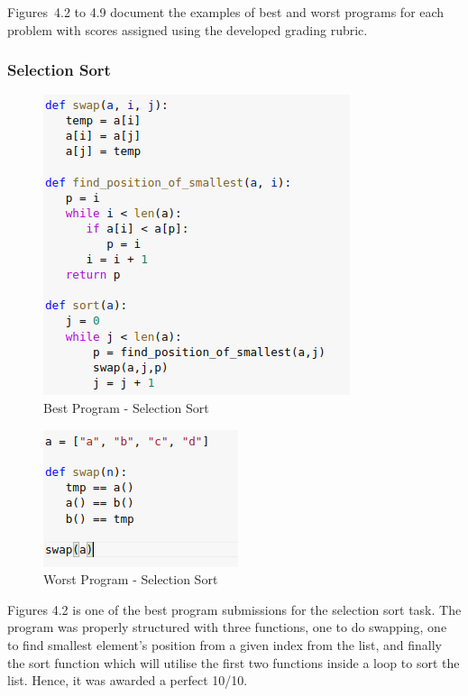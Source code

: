 Figures~4.2 to 4.9 document the examples of best and worst
programs for each problem with scores assigned using the
developed grading rubric.

\subsubsection{Selection Sort}

\begin{figure}[h]
\centering
\includegraphics[]{./figures/best_ss.png}
\caption{Best Program - Selection Sort}
\label{fig1}
\end{figure}

\begin{figure}[H]
\centering
\includegraphics[scale=1.2]{./figures/ss_worst.png}
\caption{Worst Program - Selection Sort}
\label{fig1}
\end{figure}


Figures 4.2 is one of the best program submissions for the
selection sort task. The program was properly structured with
three functions, one to do swapping, one to find smallest
element's position from a given index from the list, and
finally the sort function which will utilise the first two
functions inside a loop to sort the list. Hence, it was
awarded a perfect 10/10.

